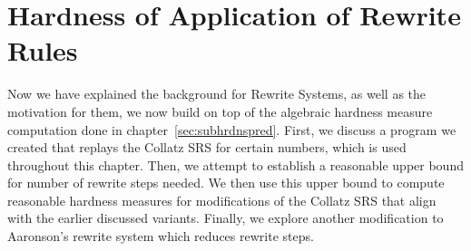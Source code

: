 
\chapter{Hardness of Application of Rewrite Rules} \label{sec:hardnessrewriterules}
Now we have explained the background for Rewrite Systems, as well as the motivation for them, we now build on top of the  algebraic hardness measure computation done in chapter~\ref{sec:subhrdnspred}. First, we discuss a program we created that replays the Collatz SRS for certain numbers, which is used throughout this chapter. Then, we attempt to establish a reasonable upper bound for number of rewrite steps needed. We then use this upper bound to compute reasonable hardness measures for modifications of the Collatz SRS that align with the earlier discussed variants. Finally, we explore another modification to Aaronson's rewrite system which reduces rewrite steps.%
